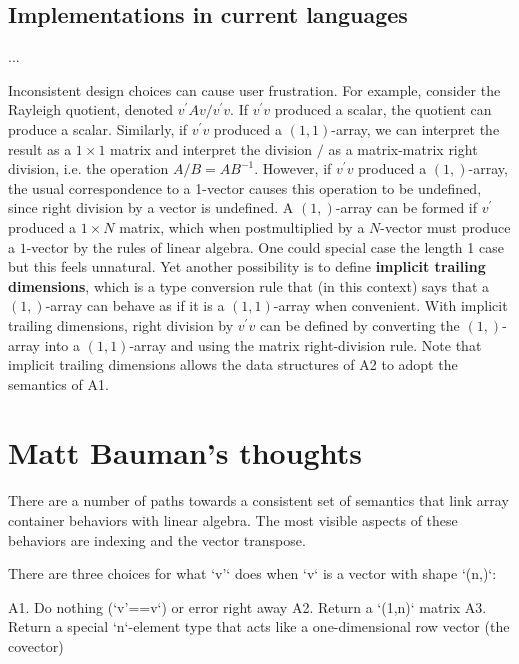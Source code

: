 \subsection{Implementations in current languages}


...

Inconsistent design choices can cause user frustration. For example,
consider the Rayleigh quotient, denoted $v^{\prime}Av/v^{\prime}v$.
If $v^{\prime}v$ produced a scalar, the quotient can produce a scalar.
Similarly, if $v^{\prime}v$ produced a $\left(1,1\right)$-array,
we can interpret the result as a $1\times1$ matrix and interpret
the division $/$ as a matrix-matrix right division, i.e. the operation
$A/B=AB^{-1}$. However, if $v^{\prime}v$ produced a $\left(1,\right)$-array,
the usual correspondence to a 1-vector causes this operation to be
undefined, since right division by a vector is undefined. A $(1,)$-array
can be formed if $v^{\prime}$ produced a $1\times N$ matrix, which
when postmultiplied by a $N$-vector must produce a $1$-vector by
the rules of linear algebra. One could special case the length 1 case
but this feels unnatural. Yet another possibility is to define \textbf{implicit
trailing dimensions}, which is a type conversion rule that (in this
context) says that a $(1,)$-array can behave as if it is a $(1,1)$-array
when convenient. With implicit trailing dimensions, right division
by $v^{\prime}v$ can be defined by converting the $(1,)$-array into
a $(1,1)$-array and using the matrix right-division rule. Note that
implicit trailing dimensions allows the data structures of A2 to adopt
the semantics of A1.


\section{Matt Bauman's thoughts}

There are a number of paths towards a consistent set of semantics that link
array container behaviors with linear algebra. The most visible aspects of
these behaviors are indexing and the vector transpose.


There are three choices for what `v'` does when `v` is a vector with shape `(n,)`:

A1. Do nothing (`v'==v`) or error right away
A2. Return a `(1,n)` matrix
A3. Return a special `n`-element type that acts like a one-dimensional row vector (the covector)


